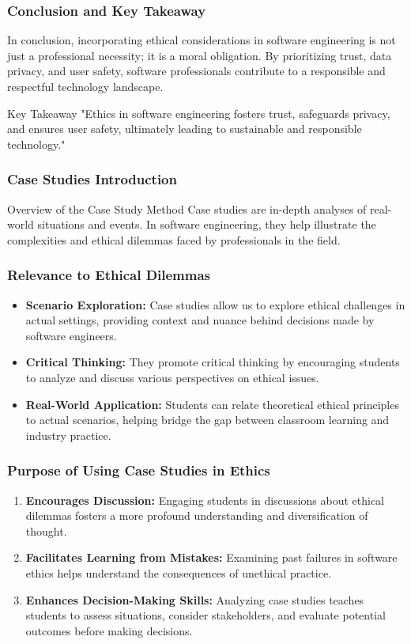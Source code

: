 \documentclass{beamer}
\begin{document}
\begin{frame}[fragile]
    \frametitle{Conclusion and Key Takeaway}
    In conclusion, incorporating ethical considerations in software engineering is not just a professional necessity; it is a moral obligation. By prioritizing trust, data privacy, and user safety, software professionals contribute to a responsible and respectful technology landscape.
    
    \begin{block}{Key Takeaway}
        "Ethics in software engineering fosters trust, safeguards privacy, and ensures user safety, ultimately leading to sustainable and responsible technology."
    \end{block}
\end{frame}

\begin{frame}[fragile]
    \frametitle{Case Studies Introduction}
    \begin{block}{Overview of the Case Study Method}
        Case studies are in-depth analyses of real-world situations and events. In software engineering, they help illustrate the complexities and ethical dilemmas faced by professionals in the field.
    \end{block}
\end{frame}

\begin{frame}[fragile]
    \frametitle{Relevance to Ethical Dilemmas}
    \begin{itemize}
        \item \textbf{Scenario Exploration:} Case studies allow us to explore ethical challenges in actual settings, providing context and nuance behind decisions made by software engineers.
        \item \textbf{Critical Thinking:} They promote critical thinking by encouraging students to analyze and discuss various perspectives on ethical issues.
        \item \textbf{Real-World Application:} Students can relate theoretical ethical principles to actual scenarios, helping bridge the gap between classroom learning and industry practice.
    \end{itemize}
\end{frame}

\begin{frame}[fragile]
    \frametitle{Purpose of Using Case Studies in Ethics}
    \begin{enumerate}
        \item \textbf{Encourages Discussion:} Engaging students in discussions about ethical dilemmas fosters a more profound understanding and diversification of thought.
        \item \textbf{Facilitates Learning from Mistakes:} Examining past failures in software ethics helps understand the consequences of unethical practice.
        \item \textbf{Enhances Decision-Making Skills:} Analyzing case studies teaches students to assess situations, consider stakeholders, and evaluate potential outcomes before making decisions.
    \end{enumerate}
\end{frame}
\end{document}
